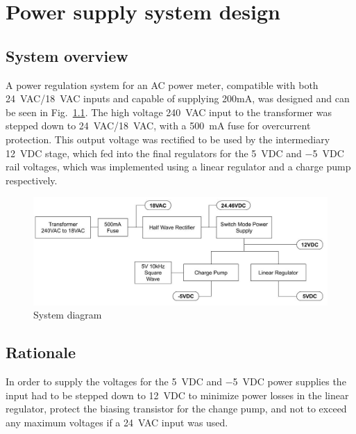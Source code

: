 \chapter{Power supply system design}
\section{System overview} \label{sec:literature_system}
A power regulation system for an AC power meter, compatible with both \SI{24}{VAC}/\SI{18}{VAC} inputs and capable of supplying 200mA, was designed and can be seen in  Fig.\ \ref{fig:system_diagram}. The high voltage \SI{240}{VAC} input to the transformer was stepped down to \SI{24}{VAC}/\SI{18}{VAC}, with a \SI{500}{\milli A} fuse for overcurrent protection. This output voltage was rectified to be used by the intermediary \SI{12}{VDC} stage, which fed into the final regulators for the \SI{+5}{VDC} and \SI{-5}{VDC} rail voltages, which was implemented using a linear regulator and a charge pump respectively.

\begin{figure}
    \centering
    \includegraphics[width = 0.7\linewidth]{Figures/power_diagram.jpg}
    \caption{System diagram}
    \label{fig:system_diagram}
\end{figure}

\section{Rationale}\label{sec:rationale_system}
In order to supply the voltages for the \SI{5}{VDC} and \SI{-5}{VDC} power supplies the input had to be stepped down to \SI{12}{VDC} to minimize power losses in the linear regulator, protect the biasing transistor for the change pump, and not to exceed any maximum voltages if a \SI{24}{VAC} input was used.






